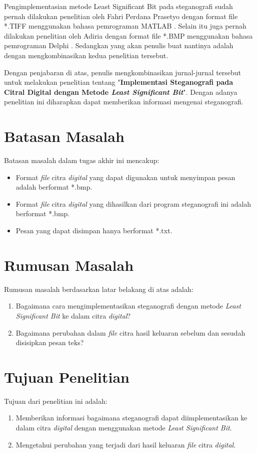 Pengimplementasian metode Least Significant Bit pada steganografi sudah pernah dilakukan penelitian oleh Fahri Perdana Prasetyo dengan format file *.TIFF menggunakan bahasa pemrograman MATLAB \cite{prasetyo}. Selain itu juga pernah dilakukan penelitian oleh Adiria dengan format file *.BMP menggunakan bahasa pemrograman Delphi \cite{adiria}. Sedangkan yang akan penulis buat nantinya adalah dengan mengkombinasikan kedua penelitian tersebut.

Dengan penjabaran di atas, penulis mengkombinasikan jurnal-jurnal tersebut untuk melakukan penelitian tentang "\textbf{Implementasi Steganografi pada Citral Digital dengan Metode \emph{Least Significant Bit}}". Dengan adanya penelitian ini diharapkan dapat memberikan informasi mengenai steganografi.

\section{Batasan Masalah}
Batasan masalah dalam tugas akhir ini mencakup:
\begin{itemize}
	\item Format \emph{file}  citra \emph{digital} yang dapat digunakan untuk menyimpan pesan adalah berformat *.bmp.
	\item Format \emph{file}  citra \emph{digital} yang dihasilkan dari program steganografi ini adalah berformat *.bmp.
	\item Pesan yang dapat disimpan hanya berformat *.txt.
\end{itemize}

\section{Rumusan Masalah}
Rumusan masalah berdasarkan latar belakang di atas adalah:
\begin{enumerate}
	\item Bagaimana cara mengimplementasikan steganografi dengan metode \emph{Least Significant Bit} ke dalam citra \emph{digital}?
	\item Bagaimana perubahan dalam \emph{file} citra hasil keluaran sebelum dan sesudah disisipkan pesan teks?
\end{enumerate}

\section{Tujuan Penelitian}
Tujuan dari penelitian ini adalah: 
\begin{enumerate}
	\item Memberikan informasi bagaimana steganografi dapat diimplementasikan ke dalam citra \emph{digital} dengan menggunakan metode \emph{Least Significant Bit}. 
	\item Mengetahui perubahan yang terjadi dari hasil keluaran \emph{file} citra \emph{digital}.
\end{enumerate}

